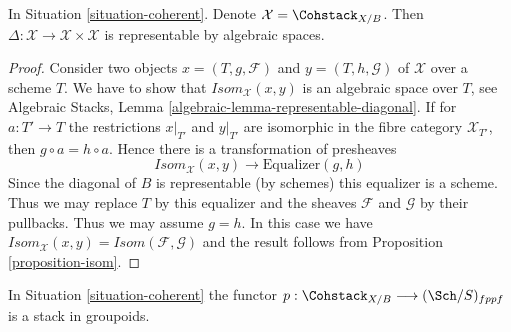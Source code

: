 \begin{lemma}
\label{lemma-coherent-diagonal}
In Situation \ref{situation-coherent}. Denote
$\mathcal{X} = \Cohstack_{X/B}$. Then
$\Delta : \mathcal{X} \to \mathcal{X} \times \mathcal{X}$ is
representable by algebraic spaces.
\end{lemma}

\begin{proof}
Consider two objects $x = (T, g, \mathcal{F})$ and $y = (T, h, \mathcal{G})$
of $\mathcal{X}$ over a scheme $T$. We have to show that
$\mathit{Isom}_\mathcal{X}(x, y)$ is an algebraic space over $T$, see
Algebraic Stacks, Lemma \ref{algebraic-lemma-representable-diagonal}.
If for $a : T' \to T$ the restrictions $x|_{T'}$ and $y|_{T'}$ are isomorphic
in the fibre category $\mathcal{X}_{T'}$, then $g \circ a = h \circ a$.
Hence there is a transformation of presheaves
$$
\mathit{Isom}_\mathcal{X}(x, y) \longrightarrow \text{Equalizer}(g, h)
$$
Since the diagonal of $B$ is representable (by schemes) this equalizer is
a scheme. Thus we may replace $T$ by this equalizer and the sheaves
$\mathcal{F}$ and $\mathcal{G}$ by their pullbacks. Thus we may assume
$g = h$. In this case we have
$\mathit{Isom}_\mathcal{X}(x, y) = \mathit{Isom}(\mathcal{F}, \mathcal{G})$
and the result follows from Proposition \ref{proposition-isom}.
\end{proof}

\begin{lemma}
\label{lemma-coherent-stack}
In Situation \ref{situation-coherent} the functor
$p : \Cohstack_{X/B} \longrightarrow (\Sch/S)_{fppf}$
is a stack in groupoids.
\end{lemma}

